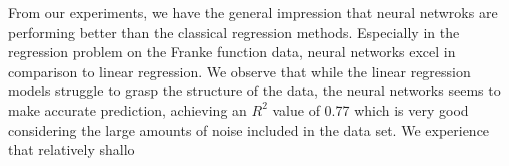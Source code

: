 From our experiments, we have the general impression that neural netwroks are performing better than the classical regression methods.
Especially in the regression problem on the Franke function data, neural networks excel in comparison to linear regression.
We observe that while the linear regression models struggle to grasp the structure of the data, the neural networks seems to make accurate prediction, achieving an $R^2$ value of 0.77 which is very good considering the large amounts of noise included in the data set.
We experience that relatively shallo